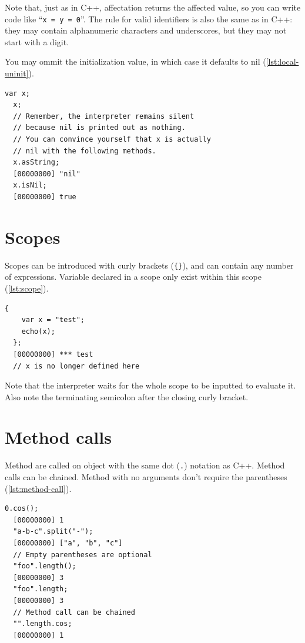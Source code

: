 \documentclass[openright,twoside,12pt]{report}
\newcommand{\Cxx}{C++\xspace}
\newcommand{\lst}[1]{\autoref{lst:#1}}
\begin{document}
Note that, just as in \Cxx, affectation returns the affected value, so
you can write code like ``\lstinline|x = y = 0|''. The rule for valid
identifiers is also the same as in \Cxx: they may contain alphanumeric
characters and underscores, but they may not start with a digit.

You may ommit the initialization value, in which case it defaults to
nil (\lst{local-uninit}).

\begin{lstlisting}[caption=Variables initialization defaults to
  nil,label=lst:local-uninit]
  var x;
  x;
  // Remember, the interpreter remains silent
  // because nil is printed out as nothing.
  // You can convince yourself that x is actually
  // nil with the following methods.
  x.asString;
  [00000000] "nil"
  x.isNil;
  [00000000] true
\end{lstlisting}

\section{Scopes}

Scopes can be introduced with curly brackets (\texttt{\{\}}), and can
contain any number of expressions. Variable declared in a scope only
exist within this scope (\lst{scope}).

\begin{lstlisting}[caption=Scoping a variable,label=lst:scope]
  {
    var x = "test";
    echo(x);
  };
  [00000000] *** test
  // x is no longer defined here
\end{lstlisting}

Note that the interpreter waits for the whole scope to be inputted to
evaluate it. Also note the terminating semicolon after the closing
curly bracket.

\section{Method calls}

Method are called on object with the same dot (\texttt{.}) notation as
\Cxx. Method calls can be chained. Method with no arguments don't
require the parentheses (\lst{method-call}).

\begin{lstlisting}[caption=Calling methods,label=lst:method-call]
  0.cos();
  [00000000] 1
  "a-b-c".split("-");
  [00000000] ["a", "b", "c"]
  // Empty parentheses are optional
  "foo".length();
  [00000000] 3
  "foo".length;
  [00000000] 3
  // Method call can be chained
  "".length.cos;
  [00000000] 1
\end{lstlisting}
\end{document}
